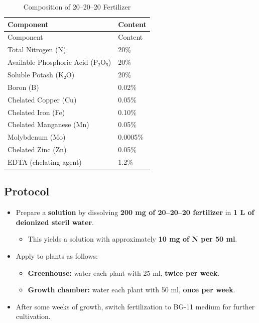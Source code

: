 \documentclass[
  11pt,
]{article}
\providecommand{\tightlist}{%
  \setlength{\itemsep}{0pt}\setlength{\parskip}{0pt}}
\begin{document}
\begin{longtable}[]{@{}ll@{}}
\caption{Composition of 20--20--20 Fertilizer}\tabularnewline
\toprule\noalign{}
Component & Content \\
\midrule\noalign{}
\endfirsthead
\toprule\noalign{}
Component & Content \\
\midrule\noalign{}
\endhead
\bottomrule\noalign{}
\endlastfoot
Total Nitrogen (N) & 20\% \\
Available Phosphoric Acid (P₂O₅) & 20\% \\
Soluble Potash (K₂O) & 20\% \\
Boron (B) & 0.02\% \\
Chelated Copper (Cu) & 0.05\% \\
Chelated Iron (Fe) & 0.10\% \\
Chelated Manganese (Mn) & 0.05\% \\
Molybdenum (Mo) & 0.0005\% \\
Chelated Zinc (Zn) & 0.05\% \\
EDTA (chelating agent) & 1.2\% \\
\end{longtable}

\subsection{Protocol}\label{protocol}

\begin{itemize}
\tightlist
\item
  Prepare a \textbf{solution} by dissolving \textbf{200 mg of 20--20--20
  fertilizer} in \textbf{1 L of deionized steril water}.

  \begin{itemize}
  \tightlist
  \item
    This yields a solution with approximately \textbf{10 mg of N per 50
    ml}.\\
  \end{itemize}
\item
  Apply to plants as follows:

  \begin{itemize}
  \tightlist
  \item
    \textbf{Greenhouse:} water each plant with 25 ml, \textbf{twice per
    week}.\\
  \item
    \textbf{Growth chamber:} water each plant with 50 ml, \textbf{once
    per week}.\\
  \end{itemize}
\item
  After some weeks of growth, switch fertilization to BG-11 medium for
  further cultivation.
\end{itemize}
\end{document}
